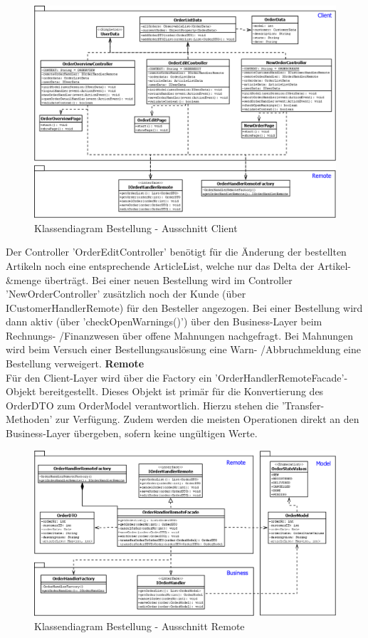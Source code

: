 \begin{figure}[H]
	\centering
	\includegraphics[width=1.0\linewidth]{Images/Class-Order-Client}
	\caption{Klassendiagram Bestellung - Ausschnitt Client}
	\label{fig:class-order-client}
\end{figure}
Der Controller 'OrderEditController' benötigt für die Änderung der bestellten Artikeln noch eine entsprechende ArticleList, welche nur das Delta der Artikel- \&menge überträgt. Bei einer neuen Bestellung wird im Controller 'NewOrderController' zusätzlich noch der Kunde (über ICustomerHandlerRemote) für den Besteller angezogen. Bei einer Bestellung wird dann aktiv (über 'checkOpenWarnings()') über den Business-Layer beim Rechnungs- /Finanzwesen über offene Mahnungen nachgefragt. Bei Mahnungen wird beim Versuch einer Bestellungsauslösung eine Warn- /Abbruchmeldung eine Bestellung verweigert.
\clearpage
\textbf{Remote}\\
Für den Client-Layer wird über die Factory ein 'OrderHandlerRemoteFacade'-Objekt bereitgestellt. Dieses Objekt ist primär für die Konvertierung des OrderDTO zum OrderModel verantwortlich. Hierzu stehen die 'Transfer-Methoden' zur Verfügung. Zudem werden die meisten Operationen direkt an den Business-Layer übergeben, sofern keine ungültigen Werte.
\begin{figure}[H]
	\centering
	\includegraphics[width=1.0\linewidth]{Images/Class-Order-Remote}
	\caption{Klassendiagram Bestellung - Ausschnitt Remote}
	\label{fig:class-order-remote}
\end{figure}
